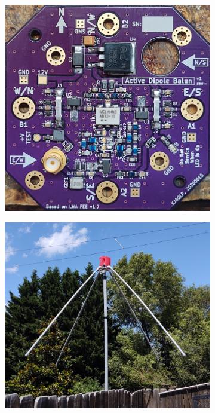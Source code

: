 \documentclass[12pt]{article}
\begin{document}
\begin{figure}[h]
  \centering
  \begin{subfigure}{.48\textwidth}
    \centering
    \includegraphics[width=.9\linewidth]{figures/populated_board.png}
  \end{subfigure}%
  \begin{subfigure}{.48\textwidth}
    \centering
    \includegraphics[width=\linewidth]{figures/crossed_inverted_v.png}
  \end{subfigure}
\end{figure}
\setcounter{figure}{0}  
\thispagestyle{title}  %
\end{document}
